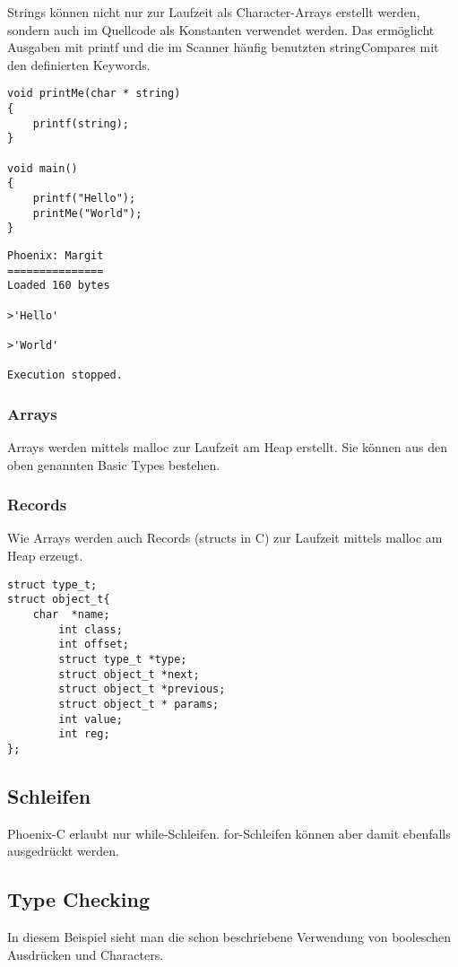 \documentclass[a4paper,12pt]{article}
\begin{document}
	Strings können nicht nur zur Laufzeit als Character-Arrays erstellt werden, sondern auch im Quellcode als Konstanten verwendet werden.
	Das ermöglicht Ausgaben mit printf und die im Scanner häufig benutzten stringCompares mit den definierten Keywords.

	\begin{lstlisting}[title=string.c,frame=single]
void printMe(char * string)
{
	printf(string);
}

void main()
{
	printf("Hello");
	printMe("World");
}	\end{lstlisting}

	\begin{lstlisting}[title=Ausgabe der Target Machine,frame=single]
Phoenix: Margit
===============
Loaded 160 bytes

>'Hello'

>'World'

Execution stopped.
	\end{lstlisting}

	\subsubsection{Arrays}

	Arrays werden mittels malloc zur Laufzeit am Heap erstellt.
	Sie können aus den oben genannten Basic Types bestehen.
	
	\subsubsection{Records}

	Wie Arrays werden auch Records (structs in C) zur Laufzeit mittels malloc am Heap erzeugt.
	
	\begin{lstlisting}[title=Struct Beispiel,frame=single]
struct type_t;
struct object_t{
	char  *name;
    	int class;
    	int offset;
    	struct type_t *type;
    	struct object_t *next;
    	struct object_t *previous;
    	struct object_t * params;
    	int value;
    	int reg;
};
         \end{lstlisting}


	\subsection{Schleifen}

	Phoenix-C erlaubt nur while-Schleifen.
	for-Schleifen können aber damit ebenfalls ausgedrückt werden.

	\subsection{Type Checking}
	In diesem Beispiel sieht man die schon beschriebene Verwendung von booleschen Ausdrücken und Characters.
\end{document}
